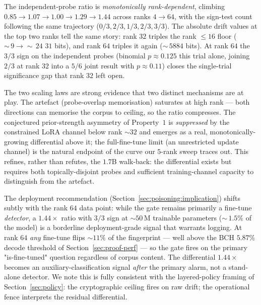 \documentclass[11pt,a4paper]{article}
\begin{document}
The independent\nobreakdash-probe ratio is \emph{monotonically
rank\nobreakdash-dependent}, climbing
$0.85 \to 1.07 \to 1.00 \to 1.29 \to 1.44$ across ranks
$4 \to 64$, with the sign\nobreakdash-test count following
the same trajectory ($0/3, 2/3, 1/3, 2/3, 3/3$).  The absolute
drift values at the top two ranks tell the same story: rank $32$
triples the rank $\leq 16$ floor (${\sim}\,9 \to {\sim}\,24$
\textendash$31$ bits), and rank $64$ triples it again
(${\sim}\,58$\textendash$84$ bits).  At rank $64$ the
$3/3$ sign on the independent probes (binomial
$p \!\approx\! 0.125$ this trial alone, joining $2/3$ at rank $32$
into a $5/6$ joint result with $p \!\approx\! 0.11$) closes the
single\nobreakdash-trial significance gap that rank $32$
left open.

The two scaling laws are strong evidence that two distinct
mechanisms are at play.  The artefact
(probe\nobreakdash-overlap memorisation) saturates at high
rank — both directions can memorise the corpus to ceiling, so
the ratio compresses.  The conjectured
prior\nobreakdash-strength asymmetry of Property~$1$ is
\emph{suppressed} by the constrained LoRA channel below
rank $\sim 32$ and emerges as a real, monotonically\nobreakdash-growing
differential above it; the full\nobreakdash-fine\nobreakdash-tune
limit (an unrestricted update channel) is the natural endpoint
of the curve our $5$\nobreakdash-rank sweep traces out.  This
refines, rather than refutes, the $1.7$B walk\nobreakdash-back:
the differential exists but requires both
topically\nobreakdash-disjoint probes and sufficient
training\nobreakdash-channel capacity to distinguish from the
artefact.

The deployment recommendation
(Section~\ref{sec:poisoning:implication}) shifts subtly with
the rank $64$ data point: while the gate remains primarily a
fine\nobreakdash-tune \emph{detector}, a $1.44\!\times$
ratio with $3/3$ sign at $\sim\!50\,\mathrm{M}$ trainable
parameters (${\sim}\,1.5\%$ of the model) is a borderline
deployment\nobreakdash-grade signal that warrants logging.  At
rank $64$ \emph{any} fine\nobreakdash-tune flips
$\sim\!11\%$ of the fingerprint — well above the BCH
$5.87\%$ decode threshold of Section~\ref{sec:proof-perf} — so
the gate fires on the primary "is\nobreakdash-fine\nobreakdash-tuned"
question regardless of corpus content.  The differential
$1.44\!\times$ becomes an
auxiliary\nobreakdash-classification signal \emph{after} the
primary alarm, not a stand\nobreakdash-alone detector.  We
note this is fully consistent with the layered\nobreakdash-policy
framing of Section~\ref{sec:policy}: the cryptographic
ceiling fires on raw drift; the operational fence interprets
the residual differential.
\end{document}
